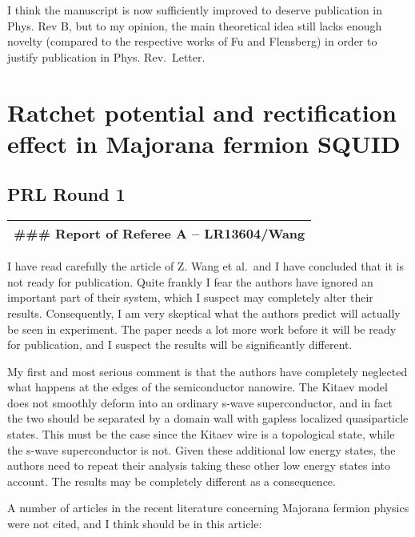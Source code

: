 \documentclass[11pt]{article}
\begin{document}
I think the manuscript is now sufficiently improved to deserve
publication in Phys. Rev B, but to my opinion, the main theoretical idea
still lacks enough novelty (compared to the respective works of Fu and
Flensberg) in order to justify publication in Phys. Rev.~Letter.

    \hypertarget{ratchet-potential-and-rectification-effect-in-majorana-fermion-squid}{%
\section{Ratchet potential and rectification effect in Majorana fermion
SQUID}\label{ratchet-potential-and-rectification-effect-in-majorana-fermion-squid}}

\hypertarget{prl-round-1}{%
\subsection{PRL Round 1}\label{prl-round-1}}

\begin{longtable}[]{@{}l@{}}
\toprule
\endhead
\#\#\# Report of Referee A -- LR13604/Wang\tabularnewline
\bottomrule
\end{longtable}

I have read carefully the article of Z. Wang et al.~and I have concluded
that it is not ready for publication. Quite frankly I fear the authors
have ignored an important part of their system, which I suspect may
completely alter their results. Consequently, I am very skeptical what
the authors predict will actually be seen in experiment. The paper needs
a lot more work before it will be ready for publication, and I suspect
the results will be significantly different.

My first and most serious comment is that the authors have completely
neglected what happens at the edges of the semiconductor nanowire. The
Kitaev model does not smoothly deform into an ordinary s-wave
superconductor, and in fact the two should be separated by a domain wall
with gapless localized quasiparticle states. This must be the case since
the Kitaev wire is a topological state, while the s-wave superconductor
is not. Given these additional low energy states, the authors need to
repeat their analysis taking these other low energy states into account.
The results may be completely different as a consequence.

A number of articles in the recent literature concerning Majorana
fermion physics were not cited, and I think should be in this article:
\end{document}
